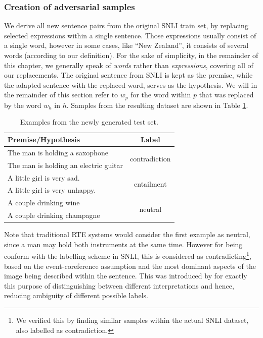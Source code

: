 \subsubsection{Creation of adversarial samples}
We derive all new sentence pairs from the original \ac{SNLI} train set, by replacing selected expressions within a single sentence. Those expressions usually consist of a single word, however in some cases, like ``New Zealand'', it consists of several words (according to our definition). For the sake of simplicity, in the remainder of this chapter, we generally speak of \textit{words} rather than \textit{expressions}, covering all of our replacements. The original sentence from \ac{SNLI} is kept as the premise, while the adapted sentence with the replaced word, serves as the hypothesis. We will in the remainder of this section refer to $w_p$ for the word within $p$ that was replaced by the word $w_h$ in $h$. Samples from the resulting dataset are shown in Table \ref{tab:new_testset_samples}.
\begin{table}[htt]
\centering
\begin{tabular}{lc}
\toprule
	\textbf{Premise/Hypothesis} & \textbf{Label} \\  \midrule
		The man is holding a saxophone & \multirow{2}{*}{contradiction} \\
        The man is holding an electric guitar & \\
        \midrule
		A little girl is very sad. & \multirow{2}{*}{entailment} \\ 
        A little girl is very unhappy.&  \\
        \midrule
		A couple drinking wine & \multirow{2}{*}{neutral} \\
        A couple drinking champagne &  \\
    \bottomrule
  \end{tabular}
  \caption{Examples from the newly generated test set.}
    \label{tab:new_testset_samples}
\end{table}
Note that traditional \ac{RTE} systems would consider the first example as neutral, since a man may hold both instruments at the same time. However for being conform with the labelling scheme in \ac{SNLI}, this is considered as contradicting\footnote{We verified this by finding similar samples within the actual \ac{SNLI} dataset, also labelled as contradiction.}, based on the event-coreference assumption and the most dominant aspects of the image being  described within the sentence. This was introduced by \cite{bowman2015large} for exactly this purpose of distinguishing between different interpretations and hence, reducing ambiguity of different possible labels.

